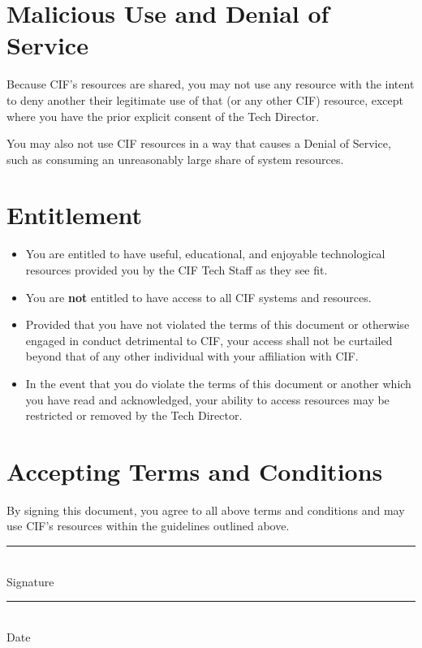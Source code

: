\documentclass[12pt]{article}
\begin{document}
\section{Malicious Use and Denial of Service} %

Because CIF's resources are shared, you may not use any resource with the intent to deny another their legitimate use of that (or any other CIF) resource, except where you have the prior explicit consent of the Tech Director.

You may also not use CIF resources in a way that causes a Denial of Service, such as consuming an unreasonably large share of system resources.


\section{Entitlement} %

\begin{itemize}
	\item You are entitled to have useful, educational, and enjoyable technological resources provided you by the CIF Tech Staff as they see fit.
	\item You are \textbf{not} entitled to have access to all CIF systems and resources.
	\item Provided that you have not violated the terms of this document or otherwise engaged in conduct detrimental to CIF, your access shall not be curtailed beyond that of any other individual with your affiliation with CIF.
	\item In the event that you do violate the terms of this document or another which you have read and acknowledged, your ability to access resources may be restricted or removed by the Tech Director.
\end{itemize}


\section{Accepting Terms and Conditions} %

By signing this document, you agree to all above terms and conditions and may use CIF's resources within the guidelines outlined above.
\bigbreak
\bigbreak
\bigbreak

\parbox{\textwidth}{
    \parbox{7cm}{
      \centering
      \rule{6cm}{1pt}\\
       Signature 
    }
    \hfill
    \parbox{7cm}{
      \centering
      \rule{6cm}{1pt}\\
      Date
    }
  }

\end{document}
